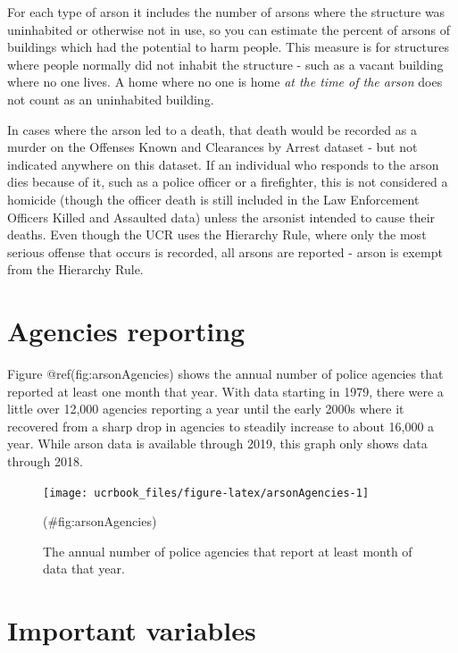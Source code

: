 \documentclass[
  12pt,
  openany]{book}
\begin{document}
For each type of arson it includes the number of arsons where the structure was uninhabited or otherwise not in use, so you can estimate the percent of arsons of buildings which had the potential to harm people. This measure is for structures where people normally did not inhabit the structure - such as a vacant building where no one lives. A home where no one is home \emph{at the time of the arson} does not count as an uninhabited building.

In cases where the arson led to a death, that death would be recorded as a murder on the Offenses Known and Clearances by Arrest dataset - but not indicated anywhere on this dataset. If an individual who responds to the arson dies because of it, such as a police officer or a firefighter, this is not considered a homicide (though the officer death is still included in the Law Enforcement Officers Killed and Assaulted data) unless the arsonist intended to cause their deaths. Even though the UCR uses the Hierarchy Rule, where only the most serious offense that occurs is recorded, all arsons are reported - arson is exempt from the Hierarchy Rule.

\hypertarget{agencies-reporting-5}{%
\section{Agencies reporting}\label{agencies-reporting-5}}

Figure @ref(fig:arsonAgencies) shows the annual number of police agencies that reported at least one month that year. With data starting in 1979, there were a little over 12,000 agencies reporting a year until the early 2000s where it recovered from a sharp drop in agencies to steadily increase to about 16,000 a year. While arson data is available through 2019, this graph only shows data through 2018.

\begin{figure}

{\centering \texttt{[image: ucrbook\_files/figure-latex/arsonAgencies-1]} 

}

\caption{The annual number of police agencies that report at least month of data that year.}(\#fig:arsonAgencies)
\end{figure}

\hypertarget{important-variables-5}{%
\section{Important variables}\label{important-variables-5}}
\end{document}
